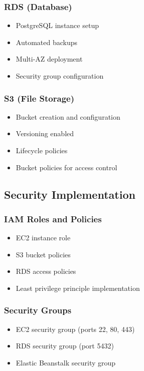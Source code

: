 \documentclass[12pt,a4paper]{article}
\begin{document}
\subsubsection{RDS (Database)}
\begin{itemize}
    \item PostgreSQL instance setup
    \item Automated backups
    \item Multi-AZ deployment
    \item Security group configuration
\end{itemize}

\subsubsection{S3 (File Storage)}
\begin{itemize}
    \item Bucket creation and configuration
    \item Versioning enabled
    \item Lifecycle policies
    \item Bucket policies for access control
\end{itemize}

\subsection{Security Implementation}

\subsubsection{IAM Roles and Policies}
\begin{itemize}
    \item EC2 instance role
    \item S3 bucket policies
    \item RDS access policies
    \item Least privilege principle implementation
\end{itemize}

\subsubsection{Security Groups}
\begin{itemize}
    \item EC2 security group (ports 22, 80, 443)
    \item RDS security group (port 5432)
    \item Elastic Beanstalk security group
\end{itemize}
\end{document}
